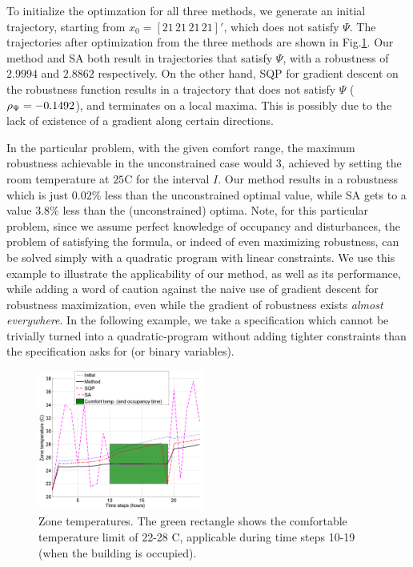 To initialize the optimzation for all three methods, we generate an initial trajectory, starting from $x_0=[21 \, 21 \, 21 \, 21]'$, which does not satisfy $\Psi$. The trajectories after optimization from the three methods are shown in Fig.\ref{fig:ZoneTemp}. Our method and SA both result in trajectories that satisfy $\Psi$, with a robustness of $2.9994$ and $2.8862$ respectively. On the other hand, SQP for gradient descent on the robustness function results in a trajectory that does not satisfy $\Psi$ ($\rho_{\Psi} = -0.1492$), and terminates on a local maxima. This is possibly due to the lack of existence of a gradient along certain directions. 

In the particular problem, with the given comfort range, the maximum robustness achievable in the unconstrained case would $3$, achieved by setting the room temperature at $25$C for the interval $I$. Our method results in a robustness which is just $0.02\%$ less than the unconstrained optimal value, while SA gets to a value $3.8\%$ less than the (unconstrained) optima. Note, for this particular problem, since we assume perfect knowledge of occupancy and disturbances, the problem of satisfying the formula, or indeed of even maximizing robustness, can be solved simply with a quadratic program with linear constraints. We use this example to illustrate the applicability of our method, as well as its performance, while adding a word of caution against the naive use of gradient descent for robustness maximization, even while the gradient of robustness exists \textit{almost everywhere}. In the following example, we take a specification which cannot be trivially turned into a quadratic-program without adding tighter constraints than the specification asks for (or binary variables).


\begin{figure}[t]
\centering
\includegraphics[width=0.49\textwidth]{figures/ZoneTemp_scissored}
\caption{Zone temperatures. The green rectangle shows the comfortable temperature limit of 22-28 C, applicable during time steps 10-19 (when the building is occupied).}
\label{fig:ZoneTemp}
\end{figure}

